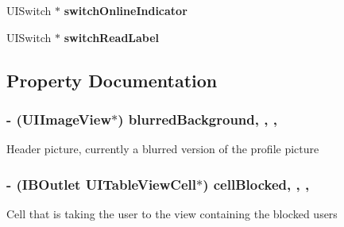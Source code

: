 \begin{DoxyCompactItemize}
\item 
\hypertarget{category_e_s_settings_view_07_08_a77e2a9e346997d525a1c730954f03993}{}U\+I\+Switch $\ast$ {\bfseries switch\+Online\+Indicator}\label{category_e_s_settings_view_07_08_a77e2a9e346997d525a1c730954f03993}

\item 
\hypertarget{category_e_s_settings_view_07_08_a819c7ee1c81823e20272ce222d976516}{}U\+I\+Switch $\ast$ {\bfseries switch\+Read\+Label}\label{category_e_s_settings_view_07_08_a819c7ee1c81823e20272ce222d976516}

\end{DoxyCompactItemize}


\subsection{Property Documentation}
\hypertarget{category_e_s_settings_view_07_08_aa10e5da12de467917791adfac7366092}{}
\subsubsection[{blurred\+Background}]{\setlength{\rightskip}{0pt plus 5cm}-\/ (U\+I\+Image\+View$\ast$) blurred\+Background\hspace{0.3cm}{\ttfamily [read]}, {\ttfamily [write]}, {\ttfamily [nonatomic]}, {\ttfamily [strong]}}\label{category_e_s_settings_view_07_08_aa10e5da12de467917791adfac7366092}
Header picture, currently a blurred version of the profile picture \hypertarget{category_e_s_settings_view_07_08_a6368189e302b5147c599dac362063c2d}{}
\subsubsection[{cell\+Blocked}]{\setlength{\rightskip}{0pt plus 5cm}-\/ (I\+B\+Outlet U\+I\+Table\+View\+Cell$\ast$) cell\+Blocked\hspace{0.3cm}{\ttfamily [read]}, {\ttfamily [write]}, {\ttfamily [nonatomic]}, {\ttfamily [strong]}}\label{category_e_s_settings_view_07_08_a6368189e302b5147c599dac362063c2d}
Cell that is taking the user to the view containing the blocked users \hypertarget{category_e_s_settings_view_07_08_a44497b402b0eaf22eaaabc34059d3690}{}
